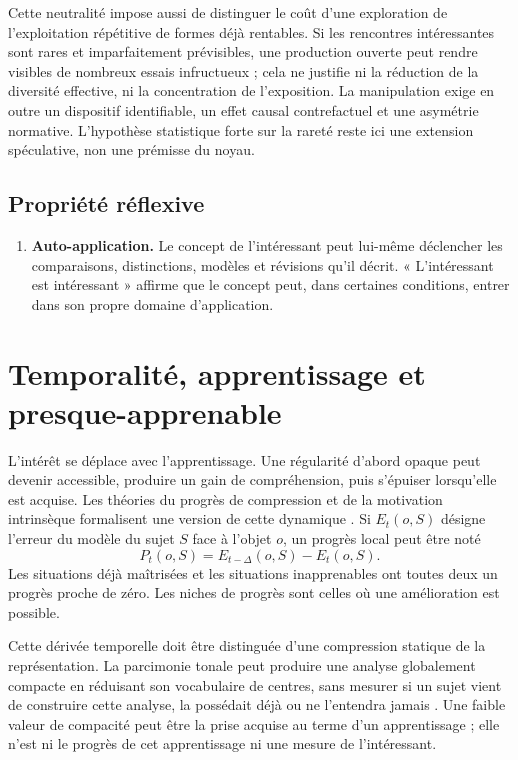 \documentclass[11pt,a4paper]{article}
\begin{document}
Cette neutralité impose aussi de distinguer le coût d'une exploration de
l'exploitation répétitive de formes déjà rentables. Si les rencontres
intéressantes sont rares et imparfaitement prévisibles, une production ouverte
peut rendre visibles de nombreux essais infructueux ; cela ne justifie ni la
réduction de la diversité effective, ni la concentration de l'exposition. La
manipulation exige en outre un dispositif identifiable, un effet causal
contrefactuel et une asymétrie normative. L'hypothèse statistique forte sur la
rareté reste ici une extension spéculative, non une prémisse du noyau.

\subsection{Propriété réflexive}

\begin{enumerate}[resume]
  \item \textbf{Auto-application.} Le concept de l'intéressant peut lui-même
        déclencher les comparaisons, distinctions, modèles et révisions qu'il
        décrit. « L'intéressant est intéressant » affirme que le concept peut,
        dans certaines conditions, entrer dans son propre domaine
        d'application.
\end{enumerate}

\section{Temporalité, apprentissage et presque-apprenable}

L'intérêt se déplace avec l'apprentissage. Une régularité d'abord opaque peut
devenir accessible, produire un gain de compréhension, puis s'épuiser lorsqu'elle
est acquise. Les théories du progrès de compression et de la motivation
intrinsèque formalisent une version de cette dynamique
\parencite{schmidhuber1997interesting,schmidhuber2009compression,oudeyer2007intrinsic,oudeyer2007typology}.
Si \(E_t(o,S)\) désigne l'erreur du modèle du sujet \(S\) face à l'objet \(o\),
un progrès local peut être noté
\[
  P_t(o,S)=E_{t-\Delta}(o,S)-E_t(o,S).
\]
Les situations déjà maîtrisées et les situations inapprenables ont toutes deux
un progrès proche de zéro. Les niches de progrès sont celles où une amélioration
est possible.

Cette dérivée temporelle doit être distinguée d'une compression statique de la
représentation. La parcimonie tonale peut produire une analyse globalement
compacte en réduisant son vocabulaire de centres, sans mesurer si un sujet vient
de construire cette analyse, la possédait déjà ou ne l'entendra jamais
\parencite{pachet2026tonalparsimony}. Une faible valeur de compacité peut être la
prise acquise au terme d'un apprentissage ; elle n'est ni le progrès de cet
apprentissage ni une mesure de l'intéressant.
\end{document}
